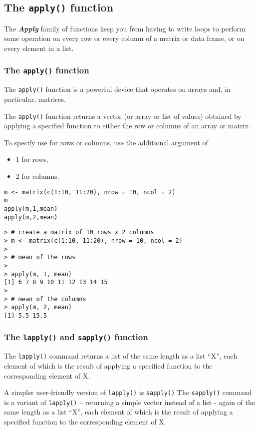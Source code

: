 \documentclass[12pt]{article}
\begin{document}
\newpage
\subsection{The \texttt{apply()} function}

The \textbf{\textit{Apply}} family of functions keep you from having to write loops to perform some operation on every row or every column of a matrix or data frame, or on every element in a list.
\subsubsection*{The \texttt{apply()} function}
The \texttt{apply()} function is a powerful device that operates on arrays and, in particular, matrices.

The  \texttt{apply()} function returns a vector (or array or list of values) obtained by applying a specified function to either the row or columns of an array or matrix.

To specify use for rows or columns, use the additional argument of \begin{itemize}
\item 1 for rows, \item 2 for columns.
\end{itemize}

\begin{framed}
\begin{verbatim}
m <- matrix(c(1:10, 11:20), nrow = 10, ncol = 2)
m
apply(m,1,mean)
apply(m,2,mean)
\end{verbatim}
\end{framed}

\begin{verbatim}
> # create a matrix of 10 rows x 2 columns
> m <- matrix(c(1:10, 11:20), nrow = 10, ncol = 2)
>
> # mean of the rows
>
> apply(m, 1, mean)
[1] 6 7 8 9 10 11 12 13 14 15
>
> # mean of the columns
> apply(m, 2, mean)
[1] 5.5 15.5
\end{verbatim}

\subsubsection*{The \texttt{lapply()} and \texttt{sapply()} function}
The \texttt{lapply()} command returns a list of the same length as a list “X”, each element of which is the result of applying a specified function to the corresponding element of X.

A simpler user-friendly version of \texttt{lapply()} is \texttt{sapply()}
The \texttt{sapply()} command is a variant of \texttt{lapply()} – returning a simple vector instead of a list - again of the same length as a list “X”, each element of which is the result of applying a specified function to the corresponding element of X.
\end{document}
